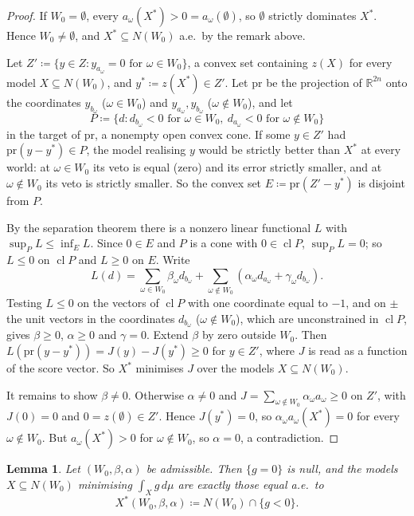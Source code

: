 \documentclass[11pt]{article}
\newcommand{\R}{\mathbb{R}}
\DeclareMathOperator{\cl}{cl}
\theoremstyle{plain}
\newtheorem{lemma}[theorem]{Lemma}
\theoremstyle{definition}
\theoremstyle{remark}
\begin{document}
\begin{proof}
If $W_0=\emptyset$, every $a_\omega(X^\ast)>0=a_\omega(\emptyset)$, so $\emptyset$ strictly
dominates $X^\ast$. Hence $W_0\neq\emptyset$, and $X^\ast\subseteq N(W_0)$ a.e.\ by the
remark above.

Let $Z'\coloneqq\{y\in Z:y_{a_\omega}=0\text{ for }\omega\in W_0\}$, a convex set
containing $z(X)$ for every model $X\subseteq N(W_0)$, and $y^\ast\coloneqq z(X^\ast)\in
Z'$. Let $\mathrm{pr}$ be the projection of $\R^{2n}$ onto the coordinates $y_{b_\omega}$
($\omega\in W_0$) and $y_{a_\omega},y_{b_\omega}$ ($\omega\notin W_0$), and let
\[
  P\coloneqq\{d:d_{b_\omega}<0\text{ for }\omega\in W_0,\ d_{a_\omega}<0\text{ for }
  \omega\notin W_0\}
\]
in the target of $\mathrm{pr}$, a nonempty open convex cone. If some $y\in Z'$ had
$\mathrm{pr}(y-y^\ast)\in P$, the model realising $y$ would be strictly better than $X^\ast$ at
every world: at $\omega\in W_0$ its veto is equal (zero) and its error strictly smaller,
and at $\omega\notin W_0$ its veto is strictly smaller. So the convex set $E\coloneqq
\mathrm{pr}(Z'-y^\ast)$ is disjoint from $P$.

By the separation theorem \cite[Thm.~11.3]{Rockafellar} there is a nonzero linear
functional $L$ with $\sup_PL\le\inf_EL$. Since $0\in E$ and $P$ is a cone with $0\in\cl P$,
$\sup_PL=0$; so $L\le0$ on $\cl P$ and $L\ge0$ on $E$. Write
\[
  L(d)=\sum_{\omega\in W_0}\beta_\omega d_{b_\omega}+\sum_{\omega\notin W_0}
  (\alpha_\omega d_{a_\omega}+\gamma_\omega d_{b_\omega}).
\]
Testing $L\le0$ on the vectors of $\cl P$ with one coordinate equal to $-1$, and on
$\pm$ the unit vectors in the coordinates $d_{b_\omega}$ ($\omega\notin W_0$), which are
unconstrained in $\cl P$, gives $\beta\ge0$, $\alpha\ge0$ and $\gamma=0$. Extend $\beta$
by zero outside $W_0$. Then $L(\mathrm{pr}(y-y^\ast))=J(y)-J(y^\ast)\ge0$ for $y\in Z'$, where
$J$ is read as a function of the score vector. So $X^\ast$ minimises $J$ over the models
$X\subseteq N(W_0)$.

It remains to show $\beta\neq0$. Otherwise $\alpha\neq0$ and $J=\sum_{\omega\notin W_0}
\alpha_\omega a_\omega\ge0$ on $Z'$, with $J(0)=0$ and $0=z(\emptyset)\in Z'$. Hence
$J(y^\ast)=0$, so $\alpha_\omega a_\omega(X^\ast)=0$ for every $\omega\notin W_0$. But
$a_\omega(X^\ast)>0$ for $\omega\notin W_0$, so $\alpha=0$, a contradiction.
\end{proof}

\begin{lemma}\label{lem:unique}
Let $(W_0,\beta,\alpha)$ be admissible. Then $\{g=0\}$ is null, and the models $X\subseteq
N(W_0)$ minimising $\int_Xg\,d\mu$ are exactly those equal a.e.\ to
\[
  X^\ast(W_0,\beta,\alpha)\coloneqq N(W_0)\cap\{g<0\}.
\]
\end{lemma}
\end{document}

